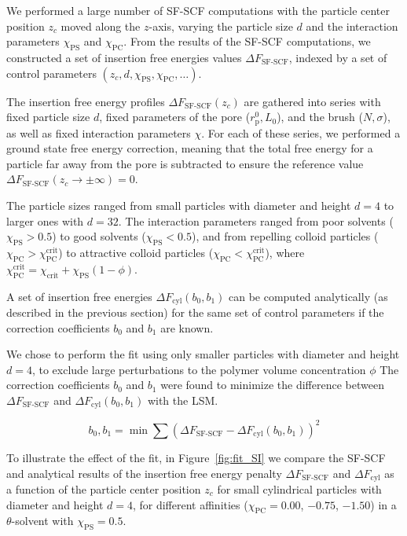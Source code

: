 \documentclass[10pt, a4paper]{article}
\begin{document}
\begin{multicols}{2}
We performed a large number of SF-SCF computations with the particle center position $z_c$ moved along the $z$-axis, varying the particle size $d$ and the interaction parameters $\chi_{\text{PS}}$ and $\chi_{\text{PC}}$.
From the results of the SF-SCF computations, we constructed a set of insertion free energies values $\Delta F_{\text{SF-SCF}}$, indexed by a set of control parameters $(z_c, d, \chi_{\text{PS}}, \chi_{\text{PC}}, \dots)$.

The insertion free energy profiles $\Delta F_{\text{SF-SCF}}(z_c)$ are gathered into series with fixed particle size $d$, fixed parameters of the pore ($r_{\text{p}}^{0}, L_{0}$), and the brush ($N, \sigma$), as well as fixed interaction parameters $\chi$.
For each of these series, we performed a ground state free energy correction, meaning that the total free energy for a particle far away from the pore is subtracted to ensure the reference value $\Delta F_{\text{SF-SCF}}(z_c \to \pm \infty) = 0$.

The particle sizes ranged from small particles with diameter and height $d = 4$ to larger ones with $d = 32$.
The interaction parameters ranged from poor solvents ($\chi_{\text{PS}} > 0.5$) to good solvents ($\chi_{\text{PS}} < 0.5$), and from repelling colloid particles ($\chi_{\text{PC}} > \chi_{\text{PC}}^{\text{crit}}$) to attractive colloid particles ($\chi_{\text{PC}} < \chi_{\text{PC}}^{\text{crit}}$), where $\chi_{\text{PC}}^{\text{crit}} = \chi_{\text{crit}} + \chi_{\text{PS}} (1 - \phi)$.

A set of insertion free energies $\Delta F_{\text{cyl}}(b_0, b_1)$ can be computed analytically (as described in the previous section) for the same set of control parameters if the correction coefficients $b_0$ and $b_1$ are known.

We chose to perform the fit using only smaller particles with diameter and height $d = 4$, to exclude large perturbations to the polymer volume concentration $\phi$
The correction coefficients $b_0$ and $b_1$ were found to minimize the difference between $\Delta F_{\text{SF-SCF}}$ and $\Delta F_{\text{cyl}}(b_0, b_1)$ with the LSM.

\begin{equation}
    b_0, b_1 = \min \sum \left(\Delta F_{\text{SF-SCF}} - \Delta F_{\text{cyl}}(b_0, b_1) \right)^{2}
\end{equation}

To illustrate the effect of the fit, in Figure~\ref{fig:fit_SI} we compare the SF-SCF and analytical results of the insertion free energy penalty $\Delta F_{\text{SF-SCF}}$ and $\Delta F_{\text{cyl}}$ as a function of the particle center position $z_c$ for small cylindrical particles with diameter and height $d = 4$, for different affinities ($\chi_{\text{PC}} = 0.00$, $-0.75$, $-1.50$) in a $\theta$-solvent with $\chi_{\text{PS}} = 0.5$.


\end{multicols}
\end{document}
